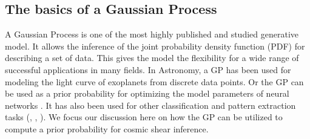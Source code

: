 \subsection{The basics of a Gaussian Process}
A Gaussian Process is one of the most highly published and studied 
generative model. It allows the inference of the joint probability density 
function (PDF) for describing a set of data. 
This gives the model the flexibility for a wide range
of successful applications in many fields. 
In Astronomy, a GP has been used for modeling 
the light curve of exoplanets from discrete data points\citep{Ambikasaran2014a}.
Or the GP can be used as a prior probability for optimizing the model parameters of
neural networks \citep{Snoek2012}. 
It has also been used for other classification and pattern extraction tasks 
(\citealt{Wilson2013}, \citealt{Duvenaud2013}, \citealt{Rasmussen2006}).
We focus our discussion here on how the GP can be utilized to compute a prior
probability for cosmic shear inference.
 
